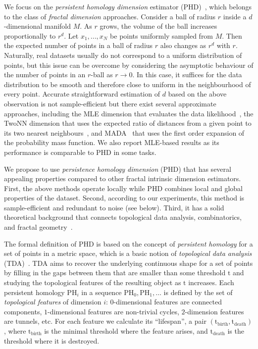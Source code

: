 \documentclass{article}
\begin{document}
We focus on the \textit{persistent homology dimension} estimator (PHD)~\citep{schweinhart2021persistent}, which belongs to the class of \textit{fractal dimension} approaches. Consider a ball of radius $r$ inside a $d$-dimensional manifold $M$. As $r$ grows, the volume of the ball increases proportionally to $r^d$. Let $x_1, ..., x_N$ be points uniformly sampled from $M$. Then the expected number of points in a ball of radius $r$ also changes as $r^d$ with $r$. Naturally, real datasets usually do not correspond to a uniform distribution of points, but this issue can be overcome by considering the asymptotic behaviour of the number of points in an $r$-ball as $r \to 0$. In this case, it suffices for the data distribution to be smooth and therefore close to uniform in the neighbourhood of every point. 
Accurate straightforward estimation of $d$ based on the above observation is not sample-efficient but there exist several approximate approaches, including the MLE dimension that evaluates the data likelihood~\citep{Levina2004MLE}, the TwoNN dimension that uses the expected ratio of distances from a given point to its two nearest neighbours~\citep{Facco2017TwoNN}, and MADA~\citep{Farahmand2007MADA} that uses the first order expansion of the probability mass function. We also report MLE-based results as its performance is comparable to PHD in some tasks.   

We propose to use \emph{persistence homology dimension} (PHD) that 
has several appealing properties compared to other fractal intrinsic dimension estimators. First, the above methods operate locally while PHD combines local and global properties of the dataset. Second, according to our experiments, this method is sample-efficient and redundant to noise (see below). Third, it has a solid theoretical background that connects topological data analysis, combinatorics, and fractal geometry~\citep{adams2020fractal, birdal2021intrinsic, jaquette2020fractal, schweinhart2021persistent}.

\def\th{\mathrm{t}}
\def\PH{\mathrm{PH}}

The formal definition of PHD is based on the concept of \textit{persistent homology} for a set of points in a metric space, which is a basic notion of \emph{topological data analysis} (TDA)~\citep{chazal2017introduction,barannikov1994,barannikov2021canonical}. TDA aims to recover the underlying continuous shape for a set of points by filling in the gaps between them that are smaller than some threshold $\th$ and studying the topological features of the resulting object as $\th$ increases. Each persistent homology $\PH_i$ in a sequence $\PH_0, \PH_1, \ldots$ is defined by the set of \textit{topological features} of dimension $i$: $0$-dimensional features are connected components, $1$-dimensional features are non-trivial cycles, $2$-dimension features are tunnels, etc. For each feature we calculate its ``lifespan'', a pair $(\th_{\mathrm{birth}}, \th_{\mathrm{death}})$, where $\th_{\mathrm{birth}}$ is the minimal threshold where the feature arises, and $\th_{\mathrm{death}}$ is the threshold where it is destroyed.   
\end{document}
